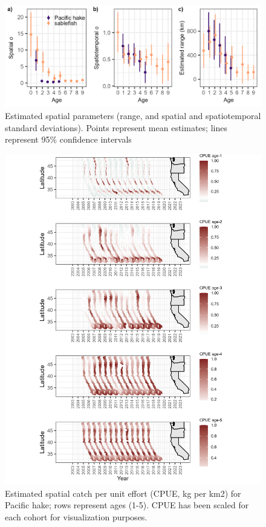 \documentclass[
]{article}
\begin{document}
\begin{figure}

{\centering \includegraphics[width=5in,height=\textheight]{plots/spatial_parameters.png}

}

\caption{\label{fig-spatial-parameters}Estimated spatial parameters
(range, and spatial and spatiotemporal standard deviations). Points
represent mean estimates; lines represent 95\% confidence intervals}

\end{figure}

\newpage

\begin{figure}

{\centering \includegraphics[width=6.2in,height=\textheight]{plots/Pacific hake-age-class-year.png}

}

\caption{\label{fig-hake-spatial-composition-all}Estimated spatial catch
per unit effort (CPUE, kg per km2) for Pacific hake; rows represent ages
(1-5). CPUE has been scaled for each cohort for visualization purposes.}

\end{figure}
\end{document}

